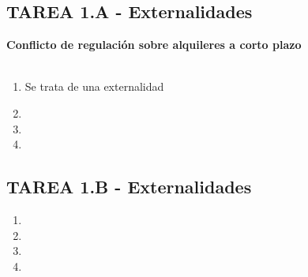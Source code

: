 \subsection*{\center TAREA 1.A - Externalidades}
\vspace{1cm}
\textbf{Conflicto de regulación sobre alquileres a corto plazo}\\\\

\begin{enumerate}

    \item Se trata de una externalidad 

    \item

    \item 

    \item 

\end{enumerate}
\newpage



\subsection*{\center TAREA 1.B - Externalidades}
\vspace{1cm}

\begin{enumerate}

    \item 

    \item

    \item

    \item	

\end{enumerate}
